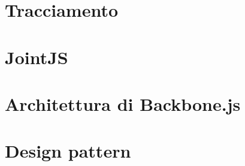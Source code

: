 % 

\section{Tracciamento}




\appendix

\section{JointJS} \label{sec:app_jointjs}


\section{Architettura di Backbone.js}


\section{Design pattern} \label{sec:app_creaz}



